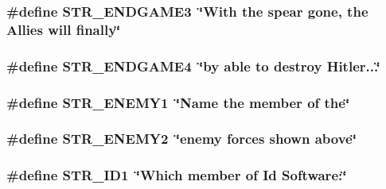 \label{F__SPEAR_8H_ad33aeaabfd56af23ac9f931c1e4c92f4}
\hypertarget{F__SPEAR_8H_a913c602f9da78106a326e522b1361173}{
\subsubsection[{STR\_\-ENDGAME3}]{\setlength{\rightskip}{0pt plus 5cm}\#define STR\_\-ENDGAME3~\char`\"{}With the spear gone, the Allies will finally\char`\"{}}}
\label{F__SPEAR_8H_a913c602f9da78106a326e522b1361173}
\hypertarget{F__SPEAR_8H_ad71b737f16d02c1e63c6190075f81ff6}{
\subsubsection[{STR\_\-ENDGAME4}]{\setlength{\rightskip}{0pt plus 5cm}\#define STR\_\-ENDGAME4~\char`\"{}by able to destroy Hitler...\char`\"{}}}
\label{F__SPEAR_8H_ad71b737f16d02c1e63c6190075f81ff6}
\hypertarget{F__SPEAR_8H_a43edc67ee966f8fc78d2e8c8470620ff}{
\subsubsection[{STR\_\-ENEMY1}]{\setlength{\rightskip}{0pt plus 5cm}\#define STR\_\-ENEMY1~\char`\"{}Name the member of the\char`\"{}}}
\label{F__SPEAR_8H_a43edc67ee966f8fc78d2e8c8470620ff}
\hypertarget{F__SPEAR_8H_a560415a9207227ba475e8f4d4aa5746e}{
\subsubsection[{STR\_\-ENEMY2}]{\setlength{\rightskip}{0pt plus 5cm}\#define STR\_\-ENEMY2~\char`\"{}enemy forces shown above\char`\"{}}}
\label{F__SPEAR_8H_a560415a9207227ba475e8f4d4aa5746e}
\hypertarget{F__SPEAR_8H_a7dd3e220239424b42dd332e203a1e127}{
\subsubsection[{STR\_\-ID1}]{\setlength{\rightskip}{0pt plus 5cm}\#define STR\_\-ID1~\char`\"{}Which member of Id Software:\char`\"{}}}

